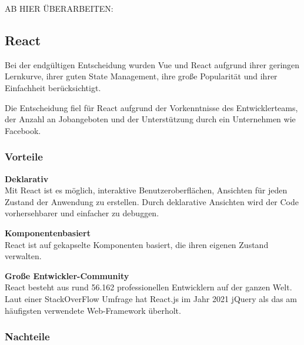 AB HIER ÜBERARBEITEN:
\\

\subsection{React}
Bei der endgültigen Entscheidung wurden Vue und React aufgrund ihrer geringen Lernkurve, ihrer guten State Management, ihre große Popularität und ihrer Einfachheit berücksichtigt.

Die Entscheidung fiel für React aufgrund der Vorkenntnisse des Entwicklerteams, der Anzahl an Jobangeboten und der Unterstützung durch ein Unternehmen wie Facebook.


\subsubsection{Vorteile}
\textbf{Deklarativ} \\
Mit React ist es möglich, interaktive Benutzeroberflächen, Ansichten für jeden Zustand der Anwendung zu erstellen. %
Durch deklarative Ansichten wird der Code vorhersehbarer und einfacher zu debuggen.
\newline

\textbf{Komponentenbasiert}\\
React ist auf gekapselte Komponenten basiert, die ihren eigenen Zustand verwalten.
\newline

\textbf{Große Entwickler-Community}\\
React besteht aus rund 56.162 professionellen Entwicklern auf der ganzen Welt.
Laut einer StackOverFlow Umfrage hat React.js im Jahr 2021 jQuery als das am häufigsten verwendete Web-Framework überholt. {\cite{SO01}}
\newpage

\subsubsection{Nachteile}

